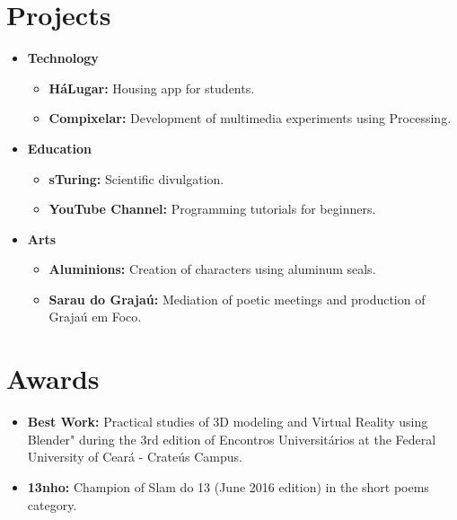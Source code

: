 \documentclass[letterpaper,11pt]{article}
\newcommand{\resumeItem}[2]{
  \item\small{
    \textbf{#1}{ #2 \vspace{-2pt}}
  }
}
\newcommand{\resumeSubItem}[2]{\resumeItem{#1}{#2}\vspace{-4pt}}
\newcommand{\resumeSubHeadingListStart}{\begin{itemize}[leftmargin=*]}
\newcommand{\resumeSubHeadingListEnd}{\end{itemize}}
\begin{document}
\section{\faRocket \hspace{0.2cm} Projects}
  \resumeSubHeadingListStart
    \resumeSubItem{Technology}{}
        \begin{itemize}
            \item \textbf{HáLugar:} Housing app for students. \href{https://play.google.com/store/apps/details?id=br.ufc.crateus.halugar}{\faInfoCircle}
            \item \textbf{Compixelar:} Development of multimedia experiments using Processing. \href{https://medium.com/@danielhbrito}{\faInfoCircle}
        \end{itemize}
    \resumeSubItem{Education}{}
        \begin{itemize}
            \item \textbf{sTuring:} Scientific divulgation. \href{https://www.instagram.com/sturing.compsci/}{\faInfoCircle}
            \item \textbf{YouTube Channel:}  Programming tutorials for beginners. \href{https://www.youtube.com/channel/UC4y3uq1d7MKDYs1LbI44Vng}{\faInfoCircle}
        \end{itemize}
    \resumeSubItem{Arts}{}
        \begin{itemize}
            \item \textbf{Aluminions:} Creation of characters using aluminum seals. \href{https://www.instagram.com/aluminions.13/}{\faInfoCircle}
            \item \textbf{Sarau do Grajaú:} Mediation of poetic meetings and production of Grajaú em Foco. \href{https://www.facebook.com/Sarau-do-Graja\%C3\%BA-191479077716775}{\faInfoCircle} 
        \end{itemize}
  \resumeSubHeadingListEnd

\section{\faTrophy \hspace{0.2cm} Awards}
  \resumeSubHeadingListStart
    \resumeSubItem{Best Work:}
      {Practical studies of 3D modeling and Virtual Reality using Blender" during the 3rd edition of Encontros Universitários at the Federal University of Ceará - Crateús Campus.}
    \resumeSubItem{13nho:}
      {Champion of Slam do 13 (June 2016 edition) in the short poems category.}
    \vspace{0.3cm}
  \resumeSubHeadingListEnd
\end{document}
